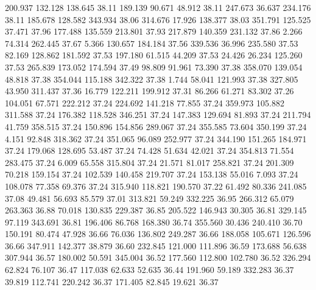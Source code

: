  200.937  132.128  138.645        38.11
 189.139   90.671   48.912        38.11
 247.673   36.637  234.176        38.11
 185.678  128.582  343.934        38.06
 314.676   17.926  138.377        38.03
 351.791  125.525   37.471        37.96
 177.488  135.559  213.801        37.93
 217.879  140.359  231.132        37.86
   2.266   74.314  262.445        37.67
   5.366  130.657  184.184        37.56
 339.536   36.996  235.580        37.53
  82.169  128.862  181.592        37.53
 197.180   61.515   44.209        37.53
  24.426   26.234  125.260        37.53
 265.839  173.052  174.594        37.49
  98.809   91.961   73.390        37.38
 358.070  139.054   48.818        37.38
 354.044  115.188  342.322        37.38
   1.744   58.041  121.993        37.38
 327.805   43.950  311.437        37.36
  16.779  122.211  199.912        37.31
  86.266   61.271   83.302        37.26
 104.051   67.571  222.212        37.24
 224.692  141.218   77.855        37.24
 359.973  105.882  311.588        37.24
 176.382  118.528  346.251        37.24
 147.383  129.694   81.893        37.24
 211.794   41.759  358.515        37.24
 150.896  154.856  289.067        37.24
 355.585   73.604  350.199        37.24
   4.151   92.848  318.362        37.24
 351.065   96.089  252.977        37.24
 344.190  151.265  184.971        37.24
 179.068  128.695   53.487        37.24
  74.428   51.634   42.021        37.24
 354.813   71.554  283.475        37.24
   6.009   65.558  315.804        37.24
  21.571   81.017  258.821        37.24
 201.309   70.218  159.154        37.24
 102.539  140.458  219.707        37.24
 153.138   55.016    7.093        37.24
 108.078   77.358   69.376        37.24
 315.940  118.821  190.570        37.22
  61.492   80.336  241.085        37.08
  49.481   56.693   85.579        37.01
 313.821   59.249  332.225        36.95
 266.312   65.079  263.363        36.88
  70.018  130.835  229.387        36.85
 205.522  146.943   30.305        36.81
 329.145   97.119  343.691        36.81
 196.406   86.768  168.380        36.74
 355.560   30.436  240.410        36.70
 150.191   80.474   47.928        36.66
  76.036  136.802  249.287        36.66
 188.058  105.671  126.596        36.66
 347.911  142.377   38.879        36.60
 232.845  121.000  111.896        36.59
 173.688   56.638  307.944        36.57
 180.002   50.591  345.004        36.52
 177.560  112.800  102.780        36.52
 326.294   62.824   76.107        36.47
 117.038   62.633   52.635        36.44
 191.960   59.189  332.283        36.37
  39.819  112.741  220.242        36.37
 171.405   82.845   19.621        36.37
